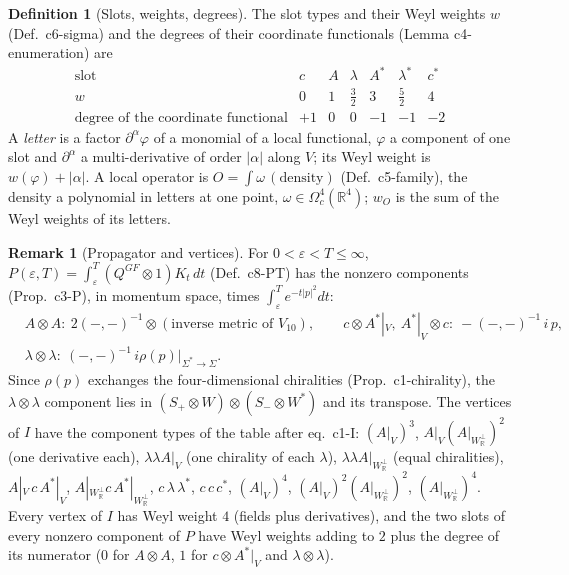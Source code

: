 \documentclass[11pt]{article}
\numberwithin{equation}{section}
\theoremstyle{plain}
\theoremstyle{definition}
\newtheorem{definition}[theorem]{Definition}
\newtheorem{remark}[theorem]{Remark}
\begin{document}
\begin{definition}[Slots, weights, degrees]
\label{def:tl-slots}
The slot types and their Weyl weights $w$ (Def.~c6-sigma) and the degrees of their coordinate functionals (Lemma c4-enumeration) are
\[
\begin{array}{c|cccccc}
\text{slot} & c & A & \lambda & A^* & \lambda^* & c^*\\\hline
w & 0 & 1 & \tfrac32 & 3 & \tfrac52 & 4\\
\text{degree of the coordinate functional} & +1 & 0 & 0 & -1 & -1 & -2
\end{array}
\]
A \emph{letter} is a factor $\partial^\alpha\varphi$ of a monomial of a local functional, $\varphi$ a component of one slot and $\partial^\alpha$ a multi-derivative of order $|\alpha|$ along $V$; its Weyl weight is $w(\varphi)+|\alpha|$. A local operator is $O=\int\omega\,(\text{density})$ (Def.~c5-family), the density a polynomial in letters at one point, $\omega\in\Omega^4_c(\mathbb R^4)$; $w_O$ is the sum of the Weyl weights of its letters.
\end{definition}

\begin{remark}[Propagator and vertices]
\label{rem:tl-P}
For $0<\varepsilon<T\le\infty$, $P(\varepsilon,T)=\int_\varepsilon^T(Q^{GF}\otimes1)K_t\,dt$ (Def.~c8-PT) has the nonzero components (Prop.~c3-P), in momentum space, times $\int_\varepsilon^Te^{-t|p|^2}dt$:
\[
\begin{aligned}&A\otimes A:\ 2(-,-)^{-1}\otimes(\text{inverse metric of }V_{10}),\qquad c\otimes A^*|_V,\ A^*|_V\otimes c:\ -(-,-)^{-1}\,i\,p,\\ &\lambda\otimes\lambda:\ (-,-)^{-1}\,i\rho(p)|_{\Sigma^*\to\Sigma}.\end{aligned}
\]
Since $\rho(p)$ exchanges the four-dimensional chiralities (Prop.~c1-chirality), the $\lambda\otimes\lambda$ component lies in $(S_+\otimes W)\otimes(S_-\otimes W^*)$ and its transpose. The vertices of $I$ have the component types of the table after eq.~c1-I: $(A|_V)^3$, $A|_V(A|_{W_{\mathbb R}^\perp})^2$ (one derivative each), $\lambda\lambda A|_V$ (one chirality of each $\lambda$), $\lambda\lambda A|_{W_{\mathbb R}^\perp}$ (equal chiralities), $A|_V\,c\,A^*|_V$, $A|_{W_{\mathbb R}^\perp}c\,A^*|_{W_{\mathbb R}^\perp}$, $c\,\lambda\,\lambda^*$, $c\,c\,c^*$, $(A|_V)^4$, $(A|_V)^2(A|_{W_{\mathbb R}^\perp})^2$, $(A|_{W_{\mathbb R}^\perp})^4$. Every vertex of $I$ has Weyl weight $4$ (fields plus derivatives), and the two slots of every nonzero component of $P$ have Weyl weights adding to $2$ plus the degree of its numerator ($0$ for $A\otimes A$, $1$ for $c\otimes A^*|_V$ and $\lambda\otimes\lambda$).
\end{remark}
\end{document}

